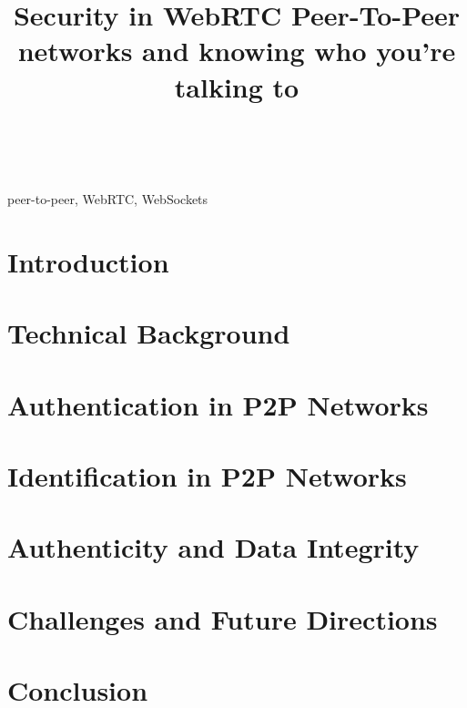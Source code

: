 \documentclass[conference]{IEEEtran}
\begin{document}
\title{Security in WebRTC Peer-To-Peer networks and knowing who you're talking to\\
}

\author{
 \\
\textit{}
}

\maketitle

\begin{abstract}
\end{abstract}

\begin{IEEEkeywords}
peer-to-peer, WebRTC, WebSockets
\end{IEEEkeywords}

\section{Introduction}

\section{Technical Background}

\section{Authentication in P2P Networks}

\section{Identification in P2P Networks}

\section{Authenticity and Data Integrity}

\section{Challenges and Future Directions}

\section{Conclusion}

\begin{thebibliography}{00}
\end{thebibliography}
\end{document}
